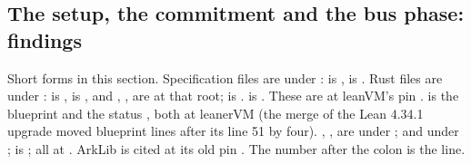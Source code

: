 \subsection{The setup, the commitment and the bus phase: findings}\label{sec:gen-bus-findings}

\begin{sloppypar}
Short forms in this section. Specification files are under :
 is ,  is .
Rust files are under :  is ,
 is , and , ,
 are at that root;  is .  is
. These are at leanVM's pin .  is the
blueprint  and  the status
, both at leanerVM  (the merge of the Lean
4.34.1 upgrade moved blueprint lines after its line 51 by four). ,
,  are under ;
 and  under ;
 is ; all at .
ArkLib is cited at its old pin . The number after the colon is the line.
\end{sloppypar}

